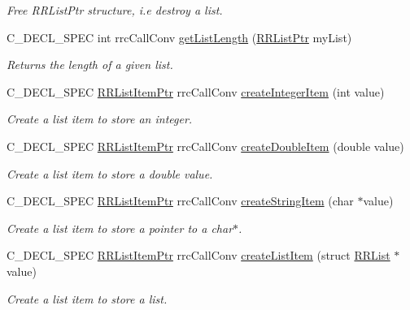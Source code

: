 \begin{DoxyCompactItemize}
\begin{DoxyCompactList}\small\item\em Free R\+R\+List\+Ptr structure, i.\+e destroy a list. \end{DoxyCompactList}\item 
C\+\_\+\+D\+E\+C\+L\+\_\+\+S\+P\+E\+C int rrc\+Call\+Conv \hyperlink{group__list_gadc06b896a3117610bbdcf25abb984f98}{get\+List\+Length} (\hyperlink{rrc__types_8h_a32a8a60ac06858ff3a791672bd2bec73}{R\+R\+List\+Ptr} my\+List)
\begin{DoxyCompactList}\small\item\em Returns the length of a given list. \end{DoxyCompactList}\item 
C\+\_\+\+D\+E\+C\+L\+\_\+\+S\+P\+E\+C \hyperlink{rrc__types_8h_a79938364b69256c42480bb3a29ebf73e}{R\+R\+List\+Item\+Ptr} rrc\+Call\+Conv \hyperlink{group__list_ga1b1b84f8ecafcb31e12e66a0f0f1b49b}{create\+Integer\+Item} (int value)
\begin{DoxyCompactList}\small\item\em Create a list item to store an integer. \end{DoxyCompactList}\item 
C\+\_\+\+D\+E\+C\+L\+\_\+\+S\+P\+E\+C \hyperlink{rrc__types_8h_a79938364b69256c42480bb3a29ebf73e}{R\+R\+List\+Item\+Ptr} rrc\+Call\+Conv \hyperlink{group__list_ga53219912496c999a31ae4f108b1a8247}{create\+Double\+Item} (double value)
\begin{DoxyCompactList}\small\item\em Create a list item to store a double value. \end{DoxyCompactList}\item 
C\+\_\+\+D\+E\+C\+L\+\_\+\+S\+P\+E\+C \hyperlink{rrc__types_8h_a79938364b69256c42480bb3a29ebf73e}{R\+R\+List\+Item\+Ptr} rrc\+Call\+Conv \hyperlink{group__list_gacc07a37b137b826130770eacd8c93d4e}{create\+String\+Item} (char $\ast$value)
\begin{DoxyCompactList}\small\item\em Create a list item to store a pointer to a char$\ast$. \end{DoxyCompactList}\item 
C\+\_\+\+D\+E\+C\+L\+\_\+\+S\+P\+E\+C \hyperlink{rrc__types_8h_a79938364b69256c42480bb3a29ebf73e}{R\+R\+List\+Item\+Ptr} rrc\+Call\+Conv \hyperlink{group__list_gab092027f0f1176d66f13cb570efa28c8}{create\+List\+Item} (struct \hyperlink{struct_r_r_list}{R\+R\+List} $\ast$value)
\begin{DoxyCompactList}\small\item\em Create a list item to store a list. \end{DoxyCompactList}\item 

\end{DoxyCompactItemize}
